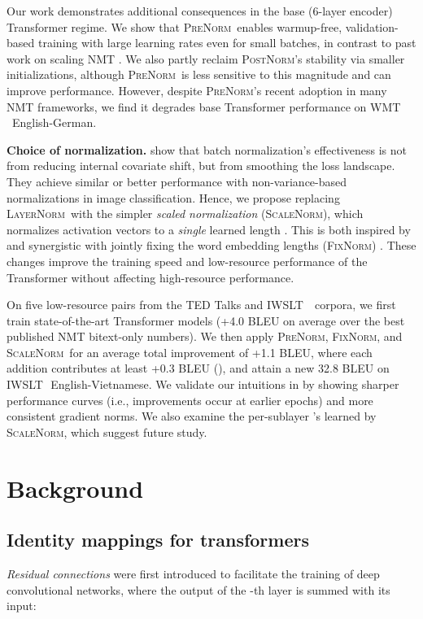 \documentclass[11pt,a4paper]{article}
\newcommand{\keyword}[1]{\textit{#1}}
\newcommand{\LNorm}{\textsc{LayerNorm}}
\newcommand{\SCNorm}{\textsc{ScaleNorm}}
\newcommand{\PreNorm}{\textsc{PreNorm}}
\newcommand{\PostNorm}{\textsc{PostNorm}}
\newcommand{\fixnorm}{\textsc{FixNorm}}
\newcommand{\WMT}{WMT\,\textquotesingle 14}
\newcommand{\IWSLT}{IWSLT\,\textquotesingle 15}
\renewcommand{\paragraph}[1]{\par\medskip\noindent\textbf{#1}}
\begin{document}
Our work demonstrates additional consequences in the base (6-layer encoder) Transformer regime. We show that \PreNorm\ enables warmup-free, validation-based training with large learning rates even for small batches, in contrast to past work on scaling NMT \cite{Ott2018}. We also partly reclaim \PostNorm's stability via smaller initializations, although \PreNorm\ is less sensitive to this magnitude and can improve performance. However, despite \PreNorm's recent adoption in many NMT frameworks, we find it degrades base Transformer performance on \WMT\ English-German.

\paragraph{Choice of normalization.} \citet{Santurkar2018} show that batch normalization's effectiveness is not from reducing internal covariate shift, but from smoothing the loss landscape. They achieve similar or better performance with non-variance-based normalizations in image classification. Hence, we propose replacing \LNorm\ with the simpler \keyword{scaled  normalization} (\SCNorm), which normalizes activation vectors to a \keyword{single} learned length . This is both inspired by and synergistic with jointly fixing the word embedding lengths (\fixnorm) \cite{Nguyen2018-improving-lexical-choice}. These changes improve the training speed and low-resource performance of the Transformer without affecting high-resource performance.
\par\medskip

On five low-resource pairs from the TED Talks \cite{Qi2018-word-embeddings-nmt} and \IWSLT\ \cite{Cettolo2015} corpora, we first train state-of-the-art Transformer models (+4.0 BLEU on average over the best published NMT bitext-only numbers). We then apply \PreNorm, \fixnorm, and \SCNorm\ for an average total improvement of +1.1 BLEU, where each addition contributes at least +0.3 BLEU (), and attain a new 32.8 BLEU on \IWSLT\ English-Vietnamese. We validate our intuitions in  by showing sharper performance curves (i.e., improvements occur at earlier epochs) and more consistent gradient norms. We also examine the per-sublayer 's learned by \SCNorm, which suggest future study.
 \section{Background}

\subsection{Identity mappings for transformers}
\label{ssec:identity-mappings}
\keyword{Residual connections} \cite{He2016} were first introduced to facilitate the training of deep convolutional networks, where the output of the -th layer  is summed with its input:
\end{document}
